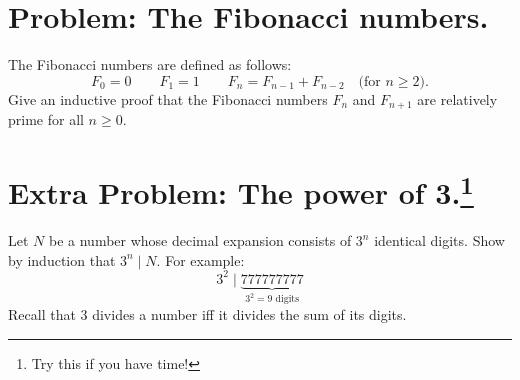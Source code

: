 \documentclass[12pt]{article}
\begin{document}
\iffalse
The Pulverizer quickly solves many problems involving congruences.
For example, suppose that we want to find a multiplicative inverse of
$k$ modulo $n$, assuming such an inverse exists.  First, we use the
Pulverizer to find integers $s$ and $t$ such that:
\[
s k + t n =  1
\]

If this equation holds, then we know that:

\[
s k \equiv 1 \pmod{n}
\]

Therefore, $s$ is the multiplicative inverse of $k$.  Problem pulverized!
\fi


\newpage
\section{Problem: The Fibonacci numbers. }

The Fibonacci numbers are defined as follows:
$$
F_0 = 0 \qquad 
F_1 = 1 \qquad 
F_n = F_{n-1} + F_{n-2} \quad \text{(for $n \geq 2$)}.
$$
Give an inductive proof that the Fibonacci numbers $F_n$ and $F_{n+1}$
are relatively prime for all $n \geq 0$.  



\newpage
\section{Extra Problem: The power of 3.\footnote{Try this if you have time!}}
Let $N$ be a number whose decimal expansion consists of $3^n$
identical digits.  Show by induction that $3^n \mid N$.  For example:
\[
3^2 \mid \underbrace{777777777}_{\text{$3^2 = 9$ digits}}
\]
Recall that $3$ divides a number iff it divides the sum of its digits.
\end{document}
